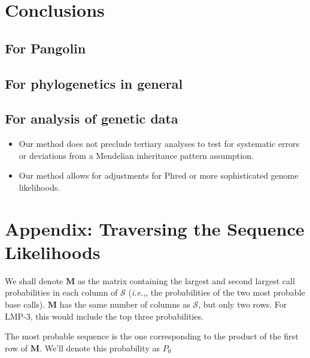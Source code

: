 \documentclass[
]{article}
\providecommand{\tightlist}{%
  \setlength{\itemsep}{0pt}\setlength{\parskip}{0pt}}
\newcommand{\ie}{\textit{i.e.},\xspace}
\newcommand{\nps}{\mathcal{S}} %
\begin{document}
\hypertarget{conclusions}{%
\section{Conclusions}\label{conclusions}}

\hypertarget{for-pangolin}{%
\subsection{For Pangolin}\label{for-pangolin}}

\hypertarget{for-phylogenetics-in-general}{%
\subsection{For phylogenetics in
general}\label{for-phylogenetics-in-general}}

\hypertarget{for-analysis-of-genetic-data}{%
\subsection{For analysis of genetic
data}\label{for-analysis-of-genetic-data}}

\begin{itemize}
\tightlist
\item
  Our method does not preclude tertiary analyses to test for systematic
  errors or deviations from a Mendelian inheritance pattern assumption.
\item
  Our method allows for adjustments for Phred or more sophisticated
  genome likelihoods.
\end{itemize}

\clearpage

\hypertarget{appendix-traversing-the-sequence-likelihoods}{%
\section{Appendix: Traversing the Sequence
Likelihoods}\label{appendix-traversing-the-sequence-likelihoods}}

We shall denote \(\mathbf M\) as the matrix containing the largest and
second largest call probabilities in each column of \(\nps\) (\ie, the
probabilities of the two most probable base calls). \(\mathbf M\) has
the same number of columns as \(\nps\), but only two rows. For LMP-3,
this would include the top three probabilities.

The most probable sequence is the one corresponding to the product of
the first row of \(\mathbf M\). We'll denote this probability as \(P_0\)
\end{document}

